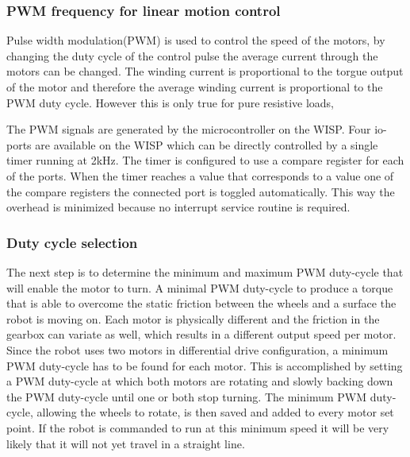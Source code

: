 \subsubsection{PWM frequency for linear motion control}

Pulse width modulation(PWM) is used to control the speed of the motors, by changing the duty cycle of the control pulse the average current through the motors can be changed.
The winding current is proportional to the torgue output of the motor and therefore the average winding current is proportional to the PWM duty cycle.
However this is only true for pure resistive loads,


The PWM signals are generated by the microcontroller on the WISP.
Four io-ports are available on the WISP which can be directly controlled by a single timer running at 2kHz.
The timer is configured to use a compare register for each of the ports.
When the timer reaches a value that corresponds to a value one of the compare registers the connected port is toggled automatically.
This way the overhead is minimized because no interrupt service routine is required.

\subsubsection{Duty cycle selection}

The next step is to determine the minimum and maximum PWM duty-cycle that will enable the motor to turn.
A minimal PWM duty-cycle to produce a torque that is able to overcome the static friction between the wheels and a surface the robot is moving on.
Each motor is physically different and the friction in the gearbox can variate as well, which results in a different output speed per motor.
Since the robot uses two motors in differential drive configuration, a minimum PWM duty-cycle has to be found for each motor.
This is accomplished by setting a PWM duty-cycle at which both motors are rotating and slowly backing down the PWM duty-cycle until one or both stop turning.
The minimum PWM duty-cycle, allowing the wheels to rotate, is then saved and added to every motor set point.
If the robot is commanded to run at this minimum speed it will be very likely that it will not yet travel in a straight line.

